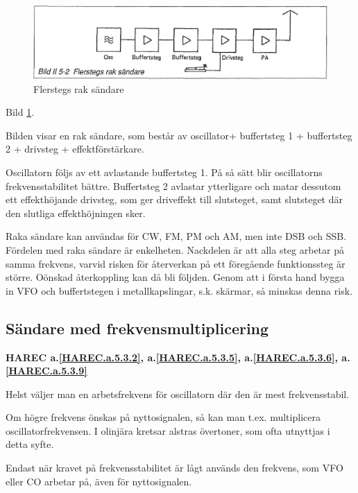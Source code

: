 \begin{figure}
  \includegraphics[width=\textwidth]{images/bild_2_5-02}
  \caption{Flerstegs rak sändare}
  \label{fig:bildII5-2}
\end{figure}

Bild \ref{fig:bildII5-2}.

Bilden visar en rak sändare, som består av oscillator+ buffertsteg 1 +
buffertsteg 2 + drivsteg + effektförstärkare.

Oscillatorn följs av ett avlastande buffertsteg 1. På så sätt blir
oscillatorns frekvensstabilitet bättre. Buffertsteg 2 avlastar
ytterligare och matar dessutom ett effekthöjande drivsteg, som ger
driveffekt till slutsteget, samt slutsteget där den slutliga
effekthöjningen sker.

Raka sändare kan användas för CW, FM, PM och AM, men inte DSB och SSB.
Fördelen med raka sändare är enkelheten.  Nackdelen är att alla steg
arbetar på samma frekvens, varvid risken för återverkan på ett
föregående funktionssteg är större. Oönskad återkoppling kan då bli
följden. Genom att i första hand bygga in VFO och buffertstegen i
metallkapslingar, s.k. skärmar, så minskas denna risk.

\subsection{Sändare med frekvensmultiplicering}
\textbf{
HAREC a.\ref{HAREC.a.5.3.2}\label{myHAREC.a.5.3.2},
 a.\ref{HAREC.a.5.3.5}\label{myHAREC.a.5.3.5},
 a.\ref{HAREC.a.5.3.6}\label{myHAREC.a.5.3.6},
 a.\ref{HAREC.a.5.3.9}\label{myHAREC.a.5.3.9}
}

Helst väljer man en arbetsfrekvens för oscillatorn där den är mest
frekvensstabil.

Om högre frekvens önskas på nyttosignalen, så kan man
t.ex. multiplicera oscillatorfrekvensen. I olinjära kretsar alstras
övertoner, som ofta utnyttjas i detta syfte.

Endast när kravet på frekvensstabilitet är lågt används den frekvens,
som VFO eller CO arbetar på, även för nyttosignalen.


